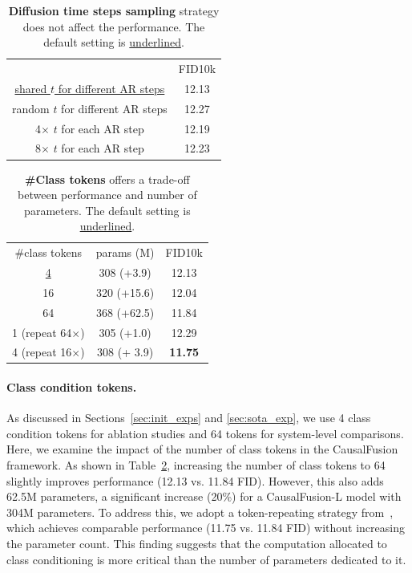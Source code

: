 \begin{table}[h]
\footnotesize
\centering
\begin{tabular}{c|c}
& FID10k\\ 
\shline
\underline{shared $t$ for different AR steps} & 12.13 \\
random $t$ for different AR steps & 12.27 \\
4$\times$ $t$ for each AR step & 12.19 \\
8$\times$ $t$ for each AR step & 12.23 \\
\end{tabular}
\vspace{-5pt}
\caption{\textbf{Diffusion time steps sampling} strategy does not affect the performance. The default setting is \underline{underlined}.}
\label{tab:timestep}
\end{table}
\vspace{-10pt}

\begin{table}[h]
\footnotesize
\centering
\begin{tabular}{c|cc}
\#class tokens & params (M) & FID10k\\ 
\shline
\underline{4} & 308 (+3.9) &  12.13 \\
16 & 320 (+15.6) &  12.04 \\
{64} & 368 (+62.5) &  11.84 \\
1 (repeat 64$\times$) & 305 (+1.0) & 12.29  \\
4 (repeat 16$\times$) & 308 (+ 3.9) & \textbf{11.75}  
\end{tabular}
\vspace{-5pt}
\caption{\textbf{\#Class tokens} offers a trade-off between performance and number of parameters. The default setting is \underline{underlined}.}
\label{tab:cls-token}
\end{table}
\vspace{-15pt}

\paragraph{Class condition tokens.} As discussed in Sections~\ref{sec:init_exps} and \ref{sec:sota_exp}, we use 4 class condition tokens for ablation studies and 64 tokens for system-level comparisons. Here, we examine the impact of the number of class tokens in the CausalFusion framework. As shown in Table~\ref{tab:cls-token}, increasing the number of class tokens to 64 slightly improves performance (12.13 vs. 11.84 FID). However, this also adds 62.5M parameters, a significant increase (20\%) for a CausalFusion-L model with 304M parameters. To address this, we adopt a token-repeating strategy from~\cite{mar}, which achieves comparable performance (11.75 vs. 11.84 FID) without increasing the parameter count. This finding suggests that the computation allocated to class conditioning is more critical than the number of parameters dedicated to it.


